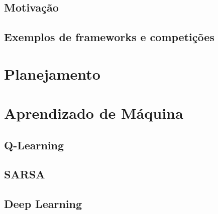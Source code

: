 \subsection{Motivação}
\subsection{Exemplos de frameworks e competições}



\section{Planejamento}



\section{Aprendizado de Máquina}
\subsection{Q-Learning}
\subsection{SARSA}
\subsection{Deep Learning}

